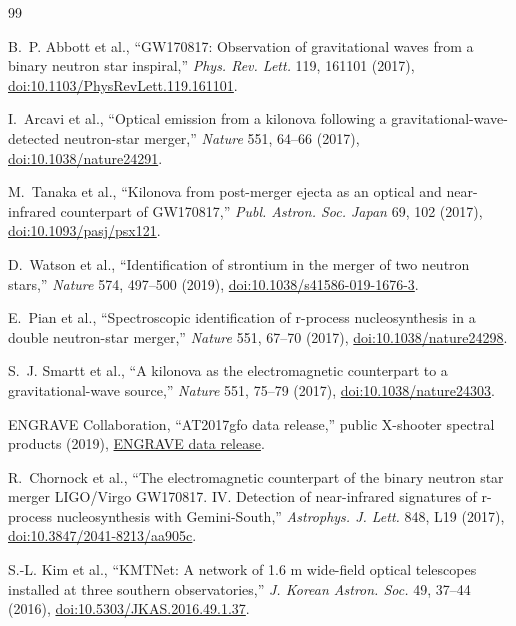 \documentclass[10pt,onecolumn]{article}
\begin{document}
\begin{thebibliography}{99}

B.~P. Abbott et al., ``GW170817: Observation of gravitational waves from a
binary neutron star inspiral,'' \emph{Phys. Rev. Lett.} 119, 161101 (2017),
\href{https://doi.org/10.1103/PhysRevLett.119.161101}{doi:10.1103/PhysRevLett.119.161101}.

I.~Arcavi et al., ``Optical emission from a kilonova following a
gravitational-wave-detected neutron-star merger,'' \emph{Nature} 551, 64--66
(2017), \href{https://doi.org/10.1038/nature24291}{doi:10.1038/nature24291}.

M.~Tanaka et al., ``Kilonova from post-merger ejecta as an optical and
near-infrared counterpart of GW170817,'' \emph{Publ. Astron. Soc. Japan} 69,
102 (2017), \href{https://doi.org/10.1093/pasj/psx121}{doi:10.1093/pasj/psx121}.

D.~Watson et al., ``Identification of strontium in the merger of two neutron
stars,'' \emph{Nature} 574, 497--500 (2019),
\href{https://doi.org/10.1038/s41586-019-1676-3}{doi:10.1038/s41586-019-1676-3}.

E.~Pian et al., ``Spectroscopic identification of r-process nucleosynthesis
in a double neutron-star merger,'' \emph{Nature} 551, 67--70 (2017),
\href{https://doi.org/10.1038/nature24298}{doi:10.1038/nature24298}.

S.~J. Smartt et al., ``A kilonova as the electromagnetic counterpart to a
gravitational-wave source,'' \emph{Nature} 551, 75--79 (2017),
\href{https://doi.org/10.1038/nature24303}{doi:10.1038/nature24303}.

ENGRAVE Collaboration, ``AT2017gfo data release,'' public X-shooter spectral
products (2019),
\href{https://www.engrave-eso.org/AT2017gfo-Data-Release/}{ENGRAVE data release}.

R.~Chornock et al., ``The electromagnetic counterpart of the binary neutron
star merger LIGO/Virgo GW170817. IV. Detection of near-infrared signatures of
r-process nucleosynthesis with Gemini-South,'' \emph{Astrophys. J. Lett.} 848,
L19 (2017),
\href{https://doi.org/10.3847/2041-8213/aa905c}{doi:10.3847/2041-8213/aa905c}.

S.-L. Kim et al., ``KMTNet: A network of 1.6 m wide-field optical telescopes
installed at three southern observatories,'' \emph{J. Korean Astron. Soc.} 49,
37--44 (2016),
\href{https://doi.org/10.5303/JKAS.2016.49.1.37}{doi:10.5303/JKAS.2016.49.1.37}.


\end{thebibliography}
\end{document}
